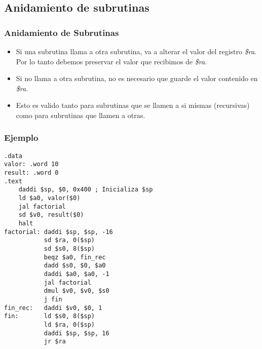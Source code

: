 \documentclass{beamer}
\begin{document}
\subsection{Anidamiento de subrutinas}
\begin{frame}
\frametitle{Anidamiento de Subrutinas}

\begin{itemize}
\item Si una subrutina llama a otra subrutina, va a alterar el valor del registro \emph{\$ra}. Por lo tanto debemos preservar el valor que recibimos de \emph{\$ra}.
\item Si no llama a otra subrutina, no es necesario que guarde el valor contenido en \emph{\$ra}.
\item Esto es valido tanto para subrutinas que se llamen a si mismas (recursivas) como para subrutinas que llamen a otras.
\end{itemize}

\end{frame}


\begin{frame}[fragile]
\frametitle{Ejemplo}
\tiny{
\begin{block}{}
\begin{lstlisting}[language=WinMIPS64,basicstyle=\ttfamily,keywordstyle=\color{blue}]
.data
valor: .word 10
result: .word 0
.text
    daddi $sp, $0, 0x400 ; Inicializa $sp
    ld $a0, valor($0)
    jal factorial
    sd $v0, result($0)
    halt
factorial: daddi $sp, $sp, -16
           sd $ra, 0($sp)
           sd $s0, 8($sp)
           beqz $a0, fin_rec
           dadd $s0, $0, $a0
           daddi $a0, $a0, -1
           jal factorial
           dmul $v0, $v0, $s0
           j fin		   
fin_rec:   daddi $v0, $0, 1
fin:       ld $s0, 8($sp)
           ld $ra, 0($sp)
           daddi $sp, $sp, 16
           jr $ra		   
\end{lstlisting}
\end{block}
}

\end{frame}
\end{document}
